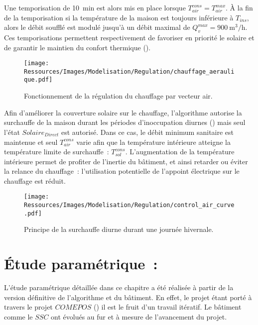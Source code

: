 Une temporisation de \SI{10}{min} est alors mis en place lorsque $T_{air}^{cons} = T_{air}^{max}$.
À la fin de la temporisation si la température de la maison est
toujours inférieure à $T_{ins}$, alors le débit soufflé est modulé jusqu’à un débit maximal de
$Q_{v}^{max} = \SI[per-mode=symbol]{900}{\meter\cubed\per\hour}$. Ces
temporisations permettent respectivement de favoriser en priorité le solaire et de
garantir le maintien du confort thermique ().

\begin{figure}
    \centering
    \texttt{[image: Ressources/Images/Modelisation/Regulation/chauffage\_aeraulique.pdf]}
    \caption{Fonctionnement de la régulation du chauffage par vecteur air.
             \label{fig:chauffage_aeraulique}}
\end{figure}

Afin d’améliorer la couverture solaire sur le chauffage, l’algorithme autorise la
surchauffe de la maison durant les périodes d’inoccupation diurnes
() mais seul l’état $Solaire_{Direct}$ est autorisé. Dans ce
cas, le débit minimum sanitaire est maintenue et seul $T_{air}^{cons}$ varie afin que la
température intérieure atteigne la température limite de surchauffe~: $T^{cons}_{sol}$.
L’augmentation de la température intérieure permet de profiter de l’inertie du bâtiment, et
ainsi retarder ou éviter la relance du chauffage~: l’utilisation potentielle de
l’appoint électrique sur le chauffage est réduit.
\begin{figure}
    \centering
    \texttt{[image: Ressources/Images/Modelisation/Regulation/control\_air\_curve.pdf]}
    \caption{Principe de la surchauffe diurne durant une journée hivernale.
             \label{fig:control_air}}
\end{figure}








\section{Étude paramétrique~:} %
\label{sec:etude_parametrique}
L’étude paramétrique détaillée dans ce chapitre a été réalisée à partir de la
version définitive de l’algorithme et du bâtiment. En effet, le projet étant
porté à travers le projet $COMEPOS$ ()
il est le fruit d’un travail itératif. Le bâtiment comme le $SSC$ ont évolués au fur et à mesure
de l’avancement du projet.

